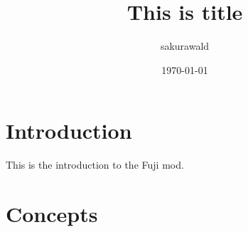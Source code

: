 \documentclass[11pt]{amsart}
\begin{document}
    \title{This is title}
    \author{sakurawald}
    \date{\today}

    \tableofcontents

    \section{Introduction}\label{sec:introduction}
    This is the introduction to the Fuji mod.

    \section{Concepts}\label{sec:concepts}
    
\end{document}
